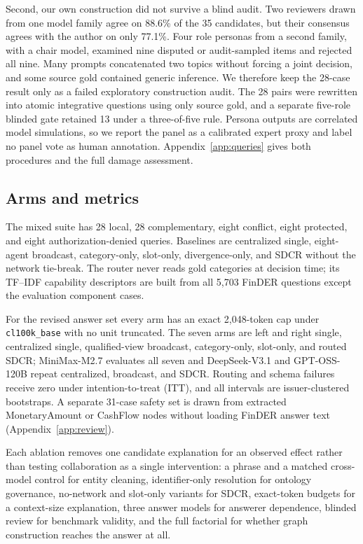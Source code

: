 \documentclass{article}
\begin{document}
Second, our own construction did not survive a blind audit. Two reviewers drawn from one model family agree on 88.6\% of the 35 candidates, but their consensus agrees with the author on only 77.1\%. Four role personas from a second family, with a chair model, examined nine disputed or audit-sampled items and rejected all nine. Many prompts concatenated two topics without forcing a joint decision, and some source gold contained generic inference. We therefore keep the 28-case result only as a failed exploratory construction audit. The 28 pairs were rewritten into atomic integrative questions using only source gold, and a separate five-role blinded gate retained 13 under a three-of-five rule. Persona outputs are correlated model simulations, so we report the panel as a calibrated expert proxy and label no panel vote as human annotation. Appendix~\ref{app:queries} gives both procedures and the full damage assessment.

\subsection{Arms and metrics}
The mixed suite has 28 local, 28 complementary, eight conflict, eight protected, and eight authorization-denied queries. Baselines are centralized single, eight-agent broadcast, category-only, slot-only, divergence-only, and SDCR without the network tie-break. The router never reads gold categories at decision time; its TF--IDF capability descriptors are built from all 5,703 FinDER questions except the evaluation component cases.

For the revised answer set every arm has an exact 2,048-token cap under \texttt{cl100k\_base} with no unit truncated. The seven arms are left and right single, centralized single, qualified-view broadcast, category-only, slot-only, and routed SDCR; MiniMax-M2.7 evaluates all seven and DeepSeek-V3.1 and GPT-OSS-120B repeat centralized, broadcast, and SDCR. Routing and schema failures receive zero under intention-to-treat (ITT), and all intervals are issuer-clustered bootstraps. A separate 31-case safety set is drawn from extracted MonetaryAmount or CashFlow nodes without loading FinDER answer text (Appendix~\ref{app:review}).

Each ablation removes one candidate explanation for an observed effect rather than testing collaboration as a single intervention: a phrase and a matched cross-model control for entity cleaning, identifier-only resolution for ontology governance, no-network and slot-only variants for SDCR, exact-token budgets for a context-size explanation, three answer models for answerer dependence, blinded review for benchmark validity, and the full factorial for whether graph construction reaches the answer at all.
\end{document}
